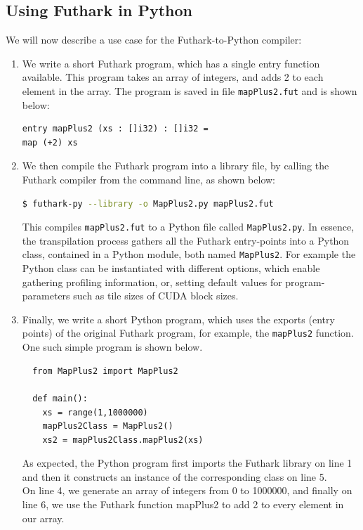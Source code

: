 \subsection{Using Futhark in Python}
We will now describe a use case for the Futhark-to-Python compiler:
\begin{enumerate}
\item We write a short Futhark program, which has a single entry function
    available. This program takes an array of integers, and
    adds 2 to each element in the array. The program is saved in file 
    {\tt mapPlus2.fut} and is shown below: %
\begin{lstlisting}[language=Futhark]
entry mapPlus2 (xs : []i32) : []i32 =
map (+2) xs
\end{lstlisting}

\item We then compile the Futhark program into a library file, by calling the
  Futhark compiler from the command line, as shown below: %
  \begin{lstlisting}[language=bash]
  $ futhark-py --library -o MapPlus2.py mapPlus2.fut
  \end{lstlisting}
  This compiles \texttt{mapPlus2.fut} to a Python file called {\tt MapPlus2.py}.
  In essence, the transpilation process gathers all the Futhark entry-points into 
  a Python class, contained in a Python module, both named {\tt MapPlus2}.
  For example the Python class can be instantiated with different options,  
    which enable gathering profiling information, or, setting default values
    for program-parameters such as tile sizes of CUDA block sizes.

\item 
    Finally, we write a short Python program, which uses the exports (entry points) 
    of the original Futhark program, for example, the {\tt mapPlus2} function.
    One such simple program is shown below.
    \begin{verbatim}
  from MapPlus2 import MapPlus2

  def main():
    xs = range(1,1000000)
    mapPlus2Class = MapPlus2()
    xs2 = mapPlus2Class.mapPlus2(xs)
  \end{verbatim}
  As expected, the Python program first imports the Futhark library on line 
    1 and then it constructs an instance of the corresponding class on line 5.\\
  On line 4, we generate an array of integers from 0 to 1000000, and finally
  on line 6, we use the Futhark function mapPlus2 to add 2 to every
  element in our array.
\end{enumerate}

